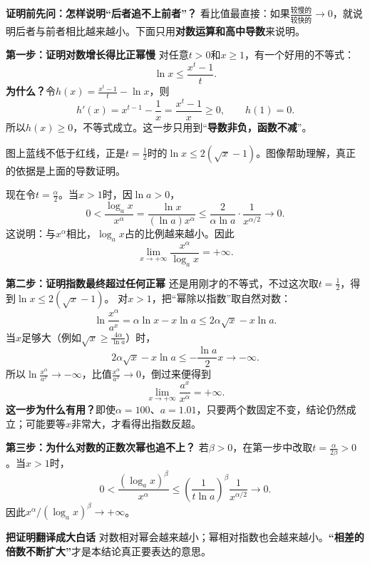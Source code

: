 \begin{proofbox}
	\textbf{\textcolor{CProof}{证明前先问：怎样说明“后者追不上前者”？}}
	看比值最直接：如果$\frac{\text{较慢的}}{\text{较快的}}\to0$，就说明后者与前者相比越来越小。下面只用\textbf{对数运算和高中导数}来说明。

	\medskip
	\textbf{\textcolor{CProof}{第一步：证明对数增长得比正幂慢}}
	对任意$t>0$和$x\ge1$，有一个好用的不等式：
	\[
		\boxed{\ln x\le\frac{x^t-1}{t}}.
	\]
	\textbf{为什么？}令$h(x)=\frac{x^t-1}{t}-\ln x$，则
	\[
		h'(x)=x^{t-1}-\frac1x=\frac{x^t-1}{x}\ge0,
		\qquad h(1)=0.
	\]
	所以$h(x)\ge0$，不等式成立。这一步只用到“\textbf{导数非负，函数不减}”。

	\begin{center}
	
	\end{center}
	图上蓝线不低于红线，正是$t=\frac12$时的$\ln x\le2(\sqrt{x}-1)$。图像帮助理解，真正的依据是上面的导数证明。

	\medskip
	现在令$t=\frac\alpha2$。当$x>1$时，因$\ln a>0$，
	\[
		0<\frac{\log_ax}{x^\alpha}
		=\frac{\ln x}{(\ln a)x^\alpha}
		\le\frac{2}{\alpha\ln a}\cdot\frac{1}{x^{\alpha/2}}
		\longrightarrow0.
	\]
	这说明：与$x^\alpha$相比，$\log_ax$占的比例越来越小。因此
	\[
		\boxed{\lim_{x\to+\infty}\frac{x^\alpha}{\log_ax}=+\infty}.
	\]

	\medskip
	\textbf{\textcolor{CProof}{第二步：证明指数最终超过任何正幂}}
	还是用刚才的不等式，不过这次取$t=\frac12$，得到$\ln x\le2(\sqrt x-1)$。
	对$x>1$，把“幂除以指数”取自然对数：
	\[
		\ln\frac{x^\alpha}{a^x}
		=\alpha\ln x-x\ln a
		\le 2\alpha\sqrt x-x\ln a.
	\]
	当$x$足够大（例如$\sqrt x\ge\frac{4\alpha}{\ln a}$）时，
	\[
		2\alpha\sqrt x-x\ln a
		\le-\frac{\ln a}{2}x\longrightarrow-\infty.
	\]
	所以$\ln\frac{x^\alpha}{a^x}\to-\infty$，比值$\frac{x^\alpha}{a^x}\to0$，倒过来便得到
	\[
		\boxed{\lim_{x\to+\infty}\frac{a^x}{x^\alpha}=+\infty}.
	\]
	\textbf{这一步为什么有用？}即使$\alpha=100$、$a=1.01$，只要两个数固定不变，结论仍然成立；可能要等$x$非常大，才看得出指数反超。
\begin{center}

\end{center}

	\medskip
	\textbf{\textcolor{CProof}{第三步：为什么对数的正数次幂也追不上？}}
	若$\beta>0$，在第一步中改取$t=\frac{\alpha}{2\beta}>0$。当$x>1$时，
	\[
		0<\frac{(\log_ax)^\beta}{x^\alpha}
		\le\left(\frac{1}{t\ln a}\right)^\beta
		\frac{1}{x^{\alpha/2}}\longrightarrow0.
	\]
	因此$x^\alpha/(\log_ax)^\beta\to+\infty$。
\begin{center}

\end{center}

	\medskip
	\textbf{\textcolor{CProof}{把证明翻译成大白话}}
	对数相对幂会越来越小；幂相对指数也会越来越小。\textbf{“相差的倍数不断扩大”}才是本结论真正要表达的意思。
\end{proofbox}
